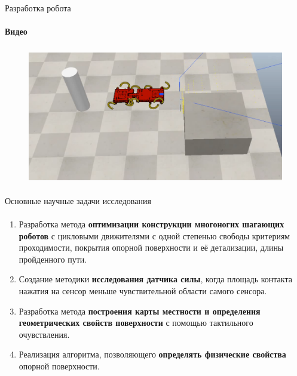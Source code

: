 \documentclass[aspectratio=169,xcolor=table,10pt]{beamer}
\begin{document}
\begin{frame}[t]{Разработка робота}
    \framesubtitle{Видео}
    \vspace{-0.6cm}
    \begin{figure}[H]
        \href{https://youtu.be/EQ6oGZVDpoc}{
            \centering\includegraphics[height=6cm,width=1\textwidth,keepaspectratio]{sidestep_segment_video_preview.png}}
    \end{figure}
\end{frame}

\begin{frame}[t]{Основные научные задачи исследования}
    \framesubtitle{}
    \begin{enumerate}
        \item Разработка метода \textbf{оптимизации конструкции многоногих шагающих роботов} с цикловыми движителями с одной степенью свободы критериям проходимости, покрытия опорной поверхности и её детализации, длины пройденного пути.
        \item Создание методики \textbf{исследования датчика силы}, когда площадь контакта нажатия на сенсор меньше чувствительной области самого сенсора.
        \item  Разработка метода \textbf{построения карты местности и определения геометрических свойств поверхности} с помощью тактильного очувствления.
        \item Реализация алгоритма, позволяющего \textbf{определять физические свойства} опорной поверхности.
    \end{enumerate}
\end{frame}
\end{document}

